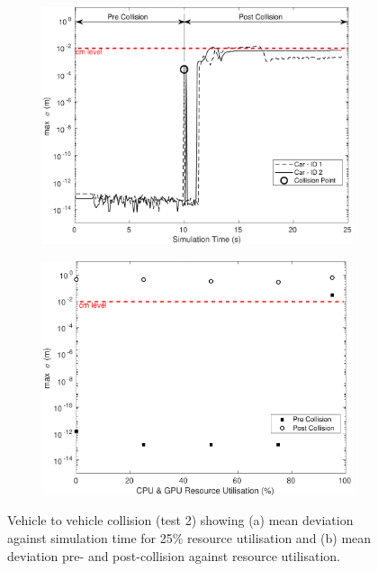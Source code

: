 \documentclass[letterpaper, 10 pt, journal, twoside]{IEEEtran}
\begin{document}
\begin{figure}[h]
    \centering
    \begin{subfigure}{.49\textwidth}
        \includegraphics[width=1\textwidth]{Other/Figures/CarsCollisionCG25_V3.pdf}
        \caption{}
        \label{CarsCollisionCG25}
    \end{subfigure}
    \begin{subfigure}{.49\textwidth}
        \includegraphics[width=1\textwidth]{Other/Figures/CarsCollisionPrePostV3.pdf}
        \caption{}
        \label{CarsCollisionPrePost}
    \end{subfigure}
    \caption{Vehicle to vehicle collision (test 2) showing (a) mean deviation against simulation time for 25\% resource utilisation and (b) mean deviation pre- and post-collision against resource utilisation.}
\end{figure}
\end{document}
